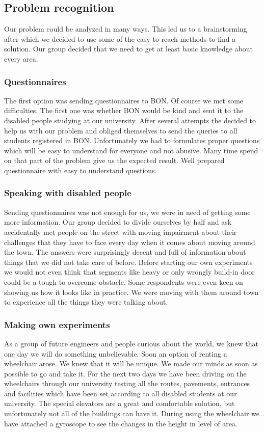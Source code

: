 \documentclass[12pt]{article}
\begin{document}
\subsection{Problem recognition}
Our problem could be analyzed in many ways. This led us to a brainstorming after which we decided to use some of the easy-to-reach methods to find a solution. Our group decided that we need to get at least basic knowledge about every area. 
\subsubsection{Questionnaires}
The first option was sending questionnaires to BON. Of course we met some difficulties. The first one was whether BON would be kind and sent it to the disabled people studying at our university. After several attempts the decided to help us with our problem and obliged themselves to send the queries to all students registered in BON. Unfortunately we had to formulates proper questions which will be easy to understand for everyone and not abusive. Many time spend on that part of the problem give us the expected result. Well prepared questionnaire with easy to understand questions. 
\subsubsection{Speaking with disabled people}
Sending questionnaires was not enough for us, we were in need of getting some more information. Our group decided to divide ourselves by half and ask accidentally met people on the street with moving impairment about their challenges that they have to face every day when it comes about moving around the town. The answers were surprisingly decent and full of information about things that we did not take care of before. Before starting our own experiments we would not even think that segments like heavy or only wrongly build-in door could be a tough to overcome obstacle. Some respondents were even keen on showing us how it looks like in practice. We were moving with them around town to experience all the things they were talking about. 
\subsubsection{Making own experiments}
As a group of future engineers and people curious about the world, we knew that one day we will do something unbelievable. Soon an option of renting a wheelchair arose. We knew that it will be unique. We made our minds as soon as possible to go and take it. For the next two days we have been driving on the wheelchairs through our university testing all the routes, pavements, entrances and facilities which have been set according to all disabled students at our university. The special elevators are a great and comfortable solution, but unfortunately not all of the buildings can have it. During using the wheelchair we have attached a gyroscope to see the changes in the height in level of area.   
\end{document}
